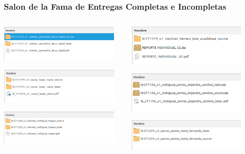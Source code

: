 \begin{frame}
\frametitle{Salon de la Fama de Entregas Completas e Incompletas}
\begin{columns}
\begin{column}{0.5\textwidth}
\begin{center}
\includegraphics[width=6cm]{Entregables/CasoBien5.png}

\includegraphics[width=6cm]{Entregables/CasoBien4.png}

\includegraphics[width=6cm]{Entregables/CasoBien3.png}
\end{center}

\end{column}
\begin{column}{0.5\textwidth}
\begin{center}
\includegraphics[width=6cm]{Entregables/CasoMal1.png}

\includegraphics[width=6cm]{Entregables/CasoMal2.png}

\includegraphics[width=6cm]{Entregables/CasoMal3.png}
\end{center}

\end{column}
\end{columns}
\end{frame}


